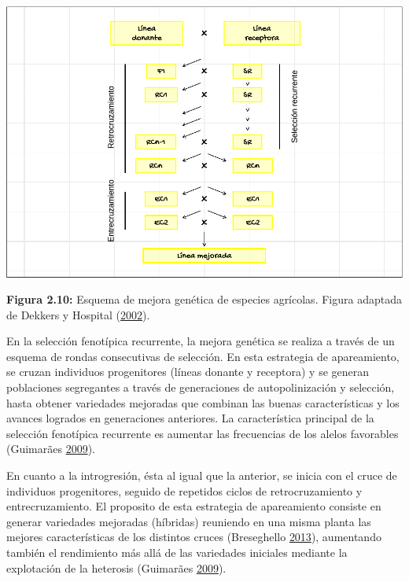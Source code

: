 \documentclass[11pt,spanish,a4paper,oneside,]{book} %
\begin{document}
\begin{center}\includegraphics[width=1\linewidth]{figures/Ap_control} \end{center}

\noindent 
\textbf{Figura 2.10:} Esquema de mejora genética de especies agrícolas. Figura adaptada de Dekkers y Hospital (\protect\hyperlink{ref-cite:59}{2002}).

\hspace*{1em}

En la selección fenotípica recurrente, la mejora genética se realiza a través de un esquema de rondas consecutivas de selección. En esta estrategia de apareamiento, se cruzan individuos progenitores (líneas donante y receptora) y se generan poblaciones segregantes a través de generaciones de autopolinización y selección, hasta obtener variedades mejoradas que combinan las buenas características y los avances logrados en generaciones anteriores. La característica principal de la selección fenotípica recurrente es aumentar las frecuencias de los alelos favorables (Guimarães \protect\hyperlink{ref-cite:62}{2009}).

En cuanto a la introgresión, ésta al igual que la anterior, se inicia con el cruce de individuos progenitores, seguido de repetidos ciclos de retrocruzamiento y entrecruzamiento. El proposito de esta estrategia de apareamiento consiste en generar variedades mejoradas (híbridas) reuniendo en una misma planta las mejores características de los distintos cruces (Breseghello \protect\hyperlink{ref-cite:57}{2013}), aumentando también el rendimiento más allá de las variedades iniciales mediante la explotación de la heterosis (Guimarães \protect\hyperlink{ref-cite:62}{2009}).
\end{document}
